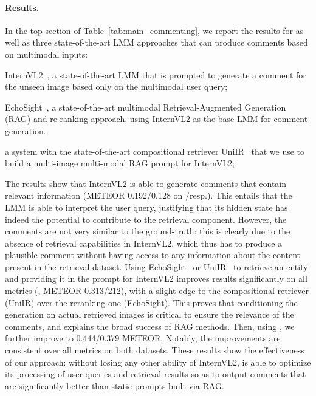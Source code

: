 %
%
%

%


%
%
%
%
%
%

%
%
%
%
%
%
%
%
%
%
%
%
%
%
%
%
%
%

\paragraph{Results.} 
In the top section of Table~\ref{tab:main_commenting}, we report the results
%
for \modelname as well as three state-of-the-art LMM approaches that can produce comments based on multimodal inputs:
\begin{enumerate*}[\roman*)]
\item InternVL2~\cite{chen2024internvl}, a state-of-the-art LMM that is prompted to generate a comment for the unseen image based only on the multimodal user query;
\item EchoSight~\cite{yan-xie-2024-echosight}, a state-of-the-art multimodal Retrieval-Augmented Generation (RAG) and re-ranking approach, using InternVL2 as the base LMM for comment generation.
\item a system with the state-of-the-art compositional retriever UniIR~\cite{wei2023uniir} that we use to build a multi-image multi-modal RAG prompt for InternVL2;
\end{enumerate*}
The results show that InternVL2 is able to generate comments that contain relevant information (METEOR 0.192/0.128 on \cirrcomment/\wikicomment resp.).
This entails that the LMM is able to interpret the user query, justifying that its hidden state has indeed the potential to contribute to the retrieval component.
However, the comments are not very similar to the ground-truth: this is clearly due to the absence of retrieval capabilities in InternVL2, which thus has to produce a plausible comment without having access to any information about the content present in the retrieval dataset.
Using EchoSight~\cite{yan-xie-2024-echosight} or UniIR~\cite{wei2023uniir} to retrieve an entity and providing it in the prompt for InternVL2 improves results significantly on all metrics (\eg, METEOR 0.313/212), with a slight edge to the compositional retriever (UniIR) over the reranking one (EchoSight).
This proves that conditioning the generation on actual retrieved images is critical to ensure the relevance of the comments, and explains the broad success of RAG methods.
Then, using \modelname, we further improve to 0.444/0.379 METEOR.
Notably, the improvements are consistent over all metrics on both datasets.
These results show the effectiveness of our approach: without losing any other ability of InternVL2, \modelname is able to optimize its processing of user queries and retrieval results so as to output comments that are significantly better than static prompts built via RAG.

